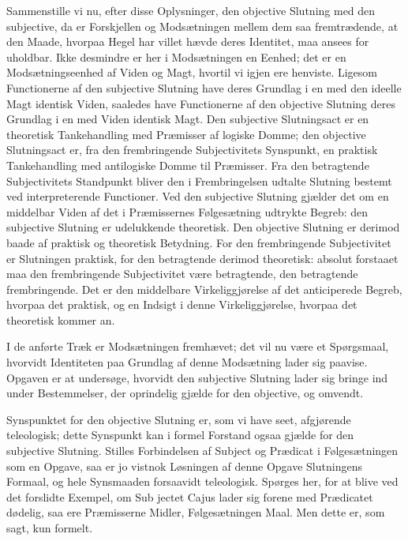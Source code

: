 \documentclass[12pt]{book}
\newcommand{\opage}[1]{\marginnote{\footnotesize\textit{[#1]}}}
\begin{document}
Sammenstille vi nu, efter disse Oplysninger, den objective Slutning med den subjective, da er Forskjellen og Modsætningen mellem dem saa fremtrædende, at den Maade, hvorpaa Hegel har villet hævde deres Identitet, maa ansees for uholdbar. Ikke desmindre er her i Modsætningen en Eenhed; det er en Modsætningseenhed af Viden og Magt, hvortil vi
\opage{397}igjen ere henviste. Ligesom Functionerne af den subjective Slutning have deres Grundlag i en med den ideelle Magt identisk Viden, saaledes have Functionerne af den objective Slutning deres Grundlag i en med Viden identisk Magt. Den subjective Slutningsact er en theoretisk Tankehandling med Præmisser af logiske Domme; den objective Slutningsact er, fra den frembringende Subjectivitets Synspunkt, en praktisk Tankehandling med antilogiske Domme til Præmisser. Fra den betragtende Subjectivitets Standpunkt bliver den i Frembringelsen udtalte Slutning bestemt ved interpreterende Functioner. Ved den subjective Slutning gjælder det om en middelbar Viden af det i Præmissernes Følgesætning udtrykte Begreb: den subjective Slutning er udelukkende theoretisk. Den objective Slutning er derimod baade af praktisk og theoretisk Betydning. For den frembringende Subjectivitet er Slutningen praktisk, for den betragtende derimod theoretisk: absolut forstaaet maa den frembringende Subjectivitet være betragtende, den betragtende frembringende. Det er den middelbare Virkeliggjørelse af det anticiperede Begreb, hvorpaa det praktisk, og en Indsigt i denne Virkeliggjørelse, hvorpaa det theoretisk kommer an.

I de anførte Træk er Modsætningen fremhævet; det vil nu være et Spørgsmaal, hvorvidt Identiteten paa Grundlag af denne Modsætning lader sig paavise. Opgaven er at undersøge, hvorvidt den subjective Slutning lader sig bringe ind under Bestemmelser, der oprindelig gjælde for den objective, og omvendt.

Synspunktet for den objective Slutning er, som vi have seet, afgjørende teleologisk; dette Synspunkt kan i formel Forstand ogsaa gjælde for den subjective Slutning. Stilles Forbindelsen af Subject og Prædicat i Følgesætningen som en Opgave, saa er jo vistnok Løsningen af denne Opgave Slutningens Formaal, og hele Synsmaaden forsaavidt teleologisk. Spørges her, for at blive ved det forslidte Exempel, om Sub%
\opage{398}jectet Cajus lader sig forene med Prædicatet dødelig, saa ere Præmisserne Midler, Følgesætningen Maal. Men dette er, som sagt, kun formelt.
\end{document}
